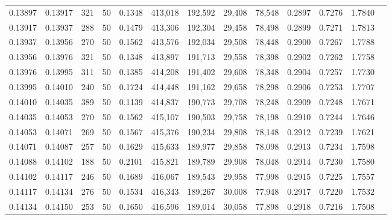 \begin{tabular}{rrrrrrrrrrrrr}
0.13897 & 0.13917 &   321 &  50 &                                     0.1348 & 413,018 & 192,592 &  29,408 &  78,548 & 0.2897 & 0.7276 & 1.7840 \\
0.13917 & 0.13937 &   288 &  50 &                                     0.1479 & 413,306 & 192,304 &  29,458 &  78,498 & 0.2899 & 0.7271 & 1.7813 \\
0.13937 & 0.13956 &   270 &  50 &                                     0.1562 & 413,576 & 192,034 &  29,508 &  78,448 & 0.2900 & 0.7267 & 1.7788 \\
0.13956 & 0.13976 &   321 &  50 &                                     0.1348 & 413,897 & 191,713 &  29,558 &  78,398 & 0.2902 & 0.7262 & 1.7758 \\
0.13976 & 0.13995 &   311 &  50 &                                     0.1385 & 414,208 & 191,402 &  29,608 &  78,348 & 0.2904 & 0.7257 & 1.7730 \\
0.13995 & 0.14010 &   240 &  50 &                                     0.1724 & 414,448 & 191,162 &  29,658 &  78,298 & 0.2906 & 0.7253 & 1.7707 \\
0.14010 & 0.14035 &   389 &  50 &                                     0.1139 & 414,837 & 190,773 &  29,708 &  78,248 & 0.2909 & 0.7248 & 1.7671 \\
0.14035 & 0.14053 &   270 &  50 &                                     0.1562 & 415,107 & 190,503 &  29,758 &  78,198 & 0.2910 & 0.7244 & 1.7646 \\
0.14053 & 0.14071 &   269 &  50 &                                     0.1567 & 415,376 & 190,234 &  29,808 &  78,148 & 0.2912 & 0.7239 & 1.7621 \\
0.14071 & 0.14087 &   257 &  50 &                                     0.1629 & 415,633 & 189,977 &  29,858 &  78,098 & 0.2913 & 0.7234 & 1.7598 \\
0.14088 & 0.14102 &   188 &  50 &                                     0.2101 & 415,821 & 189,789 &  29,908 &  78,048 & 0.2914 & 0.7230 & 1.7580 \\
0.14102 & 0.14117 &   246 &  50 &                                     0.1689 & 416,067 & 189,543 &  29,958 &  77,998 & 0.2915 & 0.7225 & 1.7557 \\
0.14117 & 0.14134 &   276 &  50 &                                     0.1534 & 416,343 & 189,267 &  30,008 &  77,948 & 0.2917 & 0.7220 & 1.7532 \\
0.14134 & 0.14150 &   253 &  50 &                                     0.1650 & 416,596 & 189,014 &  30,058 &  77,898 & 0.2918 & 0.7216 & 1.7508 \\

\end{tabular}
